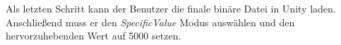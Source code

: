 Als letzten Schritt kann der Benutzer die finale binäre Datei in Unity laden. Anschließend muss er den \textit{SpecificValue} Modus auswählen und den hervorzuhebenden Wert auf 5000 setzen.













































